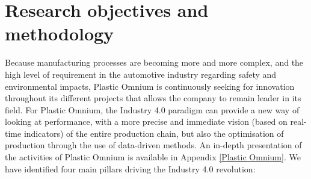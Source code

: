\section{Research objectives and methodology} \label{Research objectives and methodology}

Because manufacturing processes are becoming more and more complex, and the high level of requirement in the automotive industry regarding safety and environmental impacts, Plastic Omnium is continuously seeking for innovation throughout its different projects that allows the company to remain leader in its field. For Plastic Omnium, the Industry 4.0 paradigm can provide a new way of looking at performance, with a more precise and immediate vision (based on real-time indicators) of the entire production chain, but also the optimisation of production through the use of data-driven methods. An in-depth presentation of the activities of Plastic Omnium is available in Appendix \ref{Plastic Omnium}. We have identified four main pillars driving the Industry 4.0 revolution:

